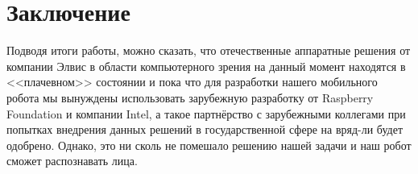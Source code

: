 \documentclass[12pt,a4paper]{scrartcl}
\begin{document}
\begin{comment}
			В данных примерах бутылка была распознана лучше всего, если она была расположена близко к камере. Объект <<стул>> время от времени исчезал, из списка распознанных предметов, а вот диван всё время определялся (хотя в рамке был лишь частично). Монитор (планшетный компьютер) распознался лучше всего: проблем с данным объектом не наблюдалось\cite{bib:Driaba_NIR}. 
			
			\end{comment}

\section{Заключение}

	Подводя итоги работы, можно сказать, что отечественные аппаратные решения от компании Элвис в области компьютерного зрения на данный момент находятся в <<плачевном>> состоянии и пока что для разработки нашего мобильного робота мы вынуждены использовать зарубежную разработку от Raspberry Foundation и компании Intel, а такое партнёрство с зарубежными коллегами при попытках внедрения данных решений в государственной сфере на вряд-ли будет одобрено. Однако, это ни сколь не помешало решению нашей задачи и наш робот сможет распознавать лица.
	
\newpage
\end{document}
